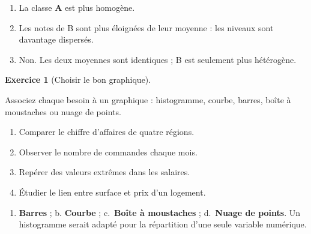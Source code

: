 \documentclass[
  french,
  letterpaper,
  open=any]{scrbook}
\providecommand{\tightlist}{%
  \setlength{\itemsep}{0pt}\setlength{\parskip}{0pt}}
\theoremstyle{definition}
\theoremstyle{definition}
\newtheorem{exercise}{Exercice}[section]
\theoremstyle{remark}
\begin{document}
\begin{tcolorbox}[enhanced jigsaw, arc=.35mm, bottomrule=.15mm, bottomtitle=1mm, breakable, colback=white, colbacktitle=quarto-callout-tip-color!10!white, colframe=quarto-callout-tip-color-frame, coltitle=black, left=2mm, leftrule=.75mm, opacityback=0, opacitybacktitle=0.6, rightrule=.15mm, title=\textcolor{quarto-callout-tip-color}{\faLightbulb}\hspace{0.5em}{Solution de l'exercice Exercice~\ref{exr-eda-5}}, titlerule=0mm, toprule=.15mm, toptitle=1mm]

\begin{enumerate}
\def\labelenumi{\alph{enumi}.}
\tightlist
\item
  La classe \textbf{A} est plus homogène.
\item
  Les notes de B sont plus éloignées de leur moyenne : les niveaux sont
  davantage dispersés.
\item
  Non. Les deux moyennes sont identiques ; B est seulement plus
  hétérogène.
\end{enumerate}

\end{tcolorbox}

\begin{exercise}[Choisir le bon
graphique]\protect\hypertarget{exr-eda-6}{}\label{exr-eda-6}

Associez chaque besoin à un graphique : histogramme, courbe, barres,
boîte à moustaches ou nuage de points.

\begin{enumerate}
\def\labelenumi{\alph{enumi}.}
\tightlist
\item
  Comparer le chiffre d'affaires de quatre régions.
\item
  Observer le nombre de commandes chaque mois.
\item
  Repérer des valeurs extrêmes dans les salaires.
\item
  Étudier le lien entre surface et prix d'un logement.
\end{enumerate}

\end{exercise}

\begin{tcolorbox}[enhanced jigsaw, arc=.35mm, bottomrule=.15mm, bottomtitle=1mm, breakable, colback=white, colbacktitle=quarto-callout-tip-color!10!white, colframe=quarto-callout-tip-color-frame, coltitle=black, left=2mm, leftrule=.75mm, opacityback=0, opacitybacktitle=0.6, rightrule=.15mm, title=\textcolor{quarto-callout-tip-color}{\faLightbulb}\hspace{0.5em}{Solution de l'exercice Exercice~\ref{exr-eda-6}}, titlerule=0mm, toprule=.15mm, toptitle=1mm]

\begin{enumerate}
\def\labelenumi{\alph{enumi}.}
\tightlist
\item
  \textbf{Barres} ; b. \textbf{Courbe} ; c.~\textbf{Boîte à moustaches}
  ; d.~\textbf{Nuage de points}. Un histogramme serait adapté pour la
  répartition d'une seule variable numérique.
\end{enumerate}

\end{tcolorbox}
\end{document}
